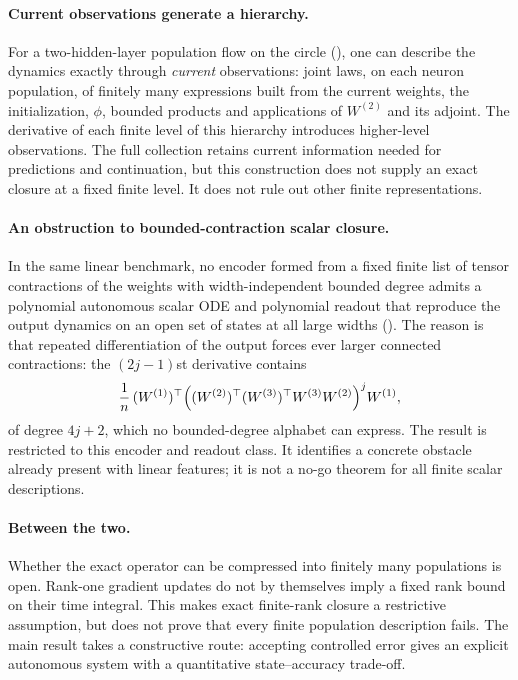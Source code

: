 \documentclass[11pt]{article}
\theoremstyle{definition}
\theoremstyle{remark}
\begin{document}
\paragraph{Current observations generate a hierarchy.}
For a two-hidden-layer population flow on the circle (), one can
describe the dynamics exactly through \emph{current} observations: joint laws,
on each neuron population, of finitely many expressions built from the current
weights, the initialization, $\phi$, bounded products and applications of
$W^{(2)}$ and its adjoint.  The derivative of each finite level of this
hierarchy introduces higher-level observations.  The full collection retains
current information needed for predictions and continuation, but this
construction does not supply an exact closure at a fixed finite level.
It does not rule out other finite representations.

\paragraph{An obstruction to bounded-contraction scalar closure.}
In the same linear benchmark, no encoder formed from a fixed finite list of
tensor contractions of the weights with width-independent bounded degree admits
a polynomial autonomous scalar ODE and polynomial readout that reproduce the
output dynamics on an open set of states at all large widths ().
The reason is that repeated differentiation of the output forces ever larger
connected contractions: the $(2j-1)$st derivative contains
\[
 \frac1n\,(W^{(1)})^\top\Bigl((W^{(2)})^\top(W^{(3)})^\top W^{(3)}W^{(2)}\Bigr)^{j}W^{(1)},
\]
of degree $4j+2$, which no bounded-degree alphabet can express.  The result is
restricted to this encoder and readout class.  It identifies a concrete
obstacle already present with linear features; it is not a no-go theorem for
all finite scalar descriptions.

\paragraph{Between the two.}
Whether the exact operator can be compressed into finitely many populations is
open.  Rank-one gradient updates do not by themselves imply a fixed rank bound
on their time integral.  This makes exact finite-rank closure a restrictive
assumption, but does not prove that every finite population description fails.
The main result takes a constructive route: accepting controlled error gives
an explicit autonomous system with a quantitative state--accuracy trade-off.
\end{document}
